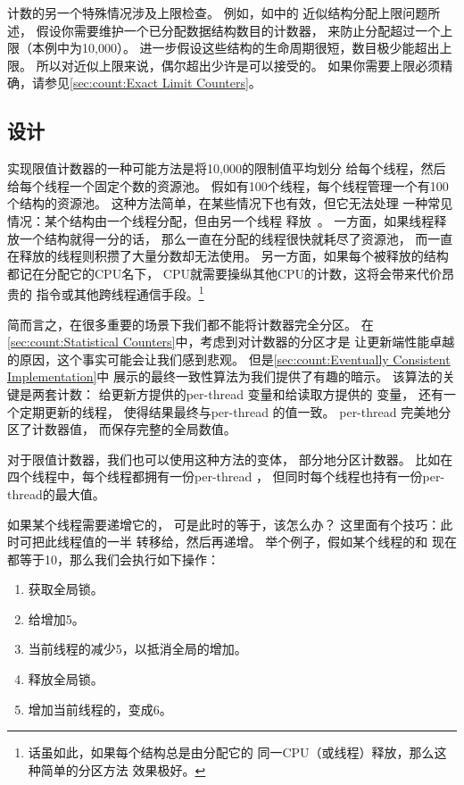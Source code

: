 计数的另一个特殊情况涉及上限检查。
例如，如\QuickQuizRef{\QcountQapproxcnt}中的
近似结构分配上限问题所述，
假设你需要维护一个已分配数据结构数目的计数器，
来防止分配超过一个上限（本例中为10,000）。
进一步假设这些结构的生命周期很短，数目极少能超出上限。
所以对近似上限来说，偶尔超出少许是可以接受的。
如果你需要上限必须精确，请参见\cref{sec:count:Exact Limit Counters}。

\subsection{设计}

实现限值计数器的一种可能方法是将10,000的限制值平均划分
给每个线程，然后给每个线程一个固定个数的资源池。
假如有100个线程，每个线程管理一个有100个结构的资源池。
这种方法简单，在某些情况下也有效，但它无法处理
一种常见情况：某个结构由一个线程分配，但由另一个线程
释放~\cite{McKenney93}。
一方面，如果线程释放一个结构就得一分的话，
那么一直在分配的线程很快就耗尽了资源池，
而一直在释放的线程则积攒了大量分数却无法使用。
另一方面，如果每个被释放的结构都记在分配它的CPU名下，
CPU就需要操纵其他CPU的计数，这将会带来代价昂贵的
指令或其他跨线程通信手段。\footnote{
	话虽如此，如果每个结构总是由分配它的
	同一CPU（或线程）释放，那么这种简单的分区方法
	效果极好。}

简而言之，在很多重要的场景下我们都不能将计数器完全分区。
在\cref{sec:count:Statistical Counters}中，考虑到对计数器的分区才是
让更新端性能卓越的原因，这个事实可能会让我们感到悲观。
但是\cref{sec:count:Eventually Consistent Implementation}中
展示的最终一致性算法为我们提供了有趣的暗示。
该算法的关键是两套计数：
给更新方提供的per-thread 变量和给读取方提供的
变量，
还有一个定期更新的线程，
使得结果最终与per-thread 的值一致。
per-thread 完美地分区了计数器值，
而保存完整的全局数值。

对于限值计数器，我们也可以使用这种方法的变体，
部分地分区计数器。
比如在四个线程中，每个线程都拥有一份per-thread ，
但同时每个线程也持有一份per-thread的最大值。

如果某个线程需要递增它的，
可是此时的等于，该怎么办？
这里面有个技巧：此时可把此线程值的一半
转移给，然后再递增。
举个例子，假如某个线程的和
现在都等于10，那么我们会执行如下操作：

\begin{enumerate}
\item	获取全局锁。
\item	给增加5。
\item	当前线程的减少5，以抵消全局的增加。
\item	释放全局锁。
\item	增加当前线程的，变成6。
\end{enumerate}

